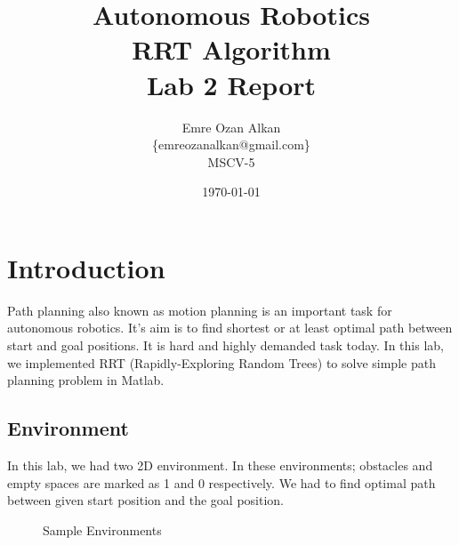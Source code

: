 \documentclass{article}
\title{Autonomous Robotics\\
		RRT Algorithm\\
		Lab 2 Report}
\author{Emre Ozan Alkan\\
		\{emreozanalkan@gmail.com\}\\
		MSCV-5}
\date{\today}
\begin{document}
\maketitle


\section{Introduction}

	Path planning also known as motion planning is an important task for autonomous robotics. It's aim is to find shortest or at least optimal path between start and goal positions. It is hard and highly demanded task today. In this lab, we implemented RRT (Rapidly-Exploring Random Trees) to solve simple path planning problem in Matlab.
	
	\subsection{Environment}
	In this lab, we had two 2D environment. In these environments; obstacles and empty spaces are marked as 1 and 0  respectively. We had to find optimal path between given start position and the goal position.
	
\begin{figure}[H]
\centering
{}
\caption{Sample Environments}
\end{figure}
	
\end{document}
